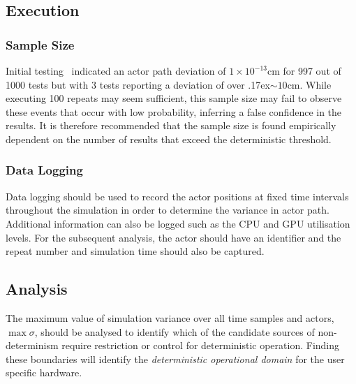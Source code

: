 \documentclass[letterpaper, 10 pt, journal, twoside]{IEEEtran}
\begin{document}
\subsection{Execution}


\subsubsection{Sample Size}
Initial testing~\cite{TSLUnrealEngineTesting} indicated an actor path deviation of $1\times10^{-13}$cm for 997 out of 1000 tests but with 3 tests reporting a deviation of over {\raise.17ex\hbox{$\scriptstyle\sim$}}$10$cm. While executing 100 repeats may seem sufficient, this sample size may fail to observe these events that occur with low probability, inferring a false confidence in the results. It is therefore recommended that the sample size is found empirically dependent on the number of results that exceed the deterministic threshold. 

\subsubsection{Data Logging}
Data logging should be used to record the actor positions at fixed time intervals throughout the simulation in order to determine the variance in actor path. Additional information can also be logged such as the CPU and GPU utilisation levels. For the subsequent analysis, the actor should have an identifier and the repeat number and simulation time should also be captured. 

\subsection{Analysis}
The maximum value of simulation variance over all time samples and actors, $\max\sigma$, should be analysed to identify which of the candidate sources of non-determinism require restriction or control for deterministic operation. Finding these boundaries will identify the \textit{deterministic operational domain} for the user specific hardware.
\end{document}
